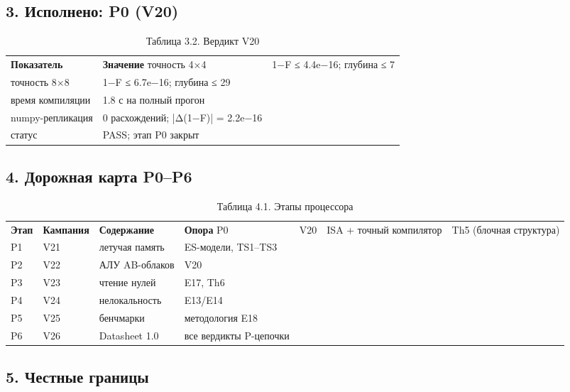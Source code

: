 \documentclass[11pt,a4paper]{article}
\begin{document}
\subsection{3. Исполнено: P0 (V20)}

\begin{table}[htbp]\centering\small
\caption{Таблица 3.2. Вердикт V20}
\begin{tabular}{p{} p{}}
\toprule
\textbf{Показатель} & \textbf{Значение}
\midrule
точность 4×4 & 1−F ≤ 4.4e−16; глубина ≤ 7 \\
точность 8×8 & 1−F ≤ 6.7e−16; глубина ≤ 29 \\
время компиляции & 1.8 с на полный прогон \\
numpy-репликация & 0 расхождений; |Δ(1−F)| = 2.2e−16 \\
статус & PASS; этап P0 закрыт \\
\bottomrule
\end{tabular}
\end{table}

\subsection{4. Дорожная карта P0–P6}

\begin{table}[htbp]\centering\small
\caption{Таблица 4.1. Этапы процессора}
\begin{tabular}{p{} p{} p{} p{}}
\toprule
\textbf{Этап} & \textbf{Кампания} & \textbf{Содержание} & \textbf{Опора}
\midrule
P0 & V20 & ISA + точный компилятор & Th5 (блочная структура) \\
P1 & V21 & летучая память & ES-модели, TS1–TS3 \\
P2 & V22 & АЛУ AB-облаков & V20 \\
P3 & V23 & чтение нулей & E17, Th6 \\
P4 & V24 & нелокальность & E13/E14 \\
P5 & V25 & бенчмарки & методология E18 \\
P6 & V26 & Datasheet 1.0 & все вердикты P-цепочки \\
\bottomrule
\end{tabular}
\end{table}

\subsection{5. Честные границы}
\end{document}
